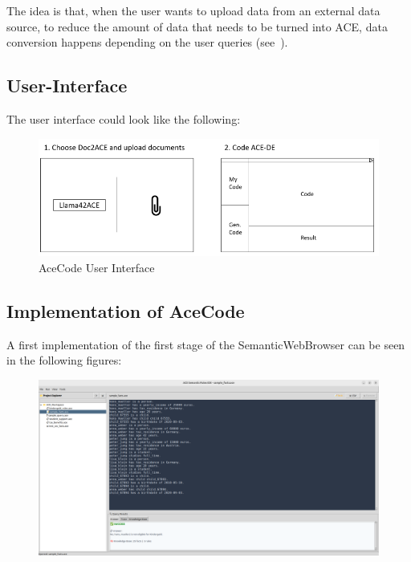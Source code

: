 \documentclass[12pt,a4paper]{article}
\begin{document}
The idea is that, when the user wants to upload data from an external data source, to reduce the amount of data that needs to be turned into ACE, data conversion happens depending on the user queries (see~\cite{schemaInference}).






\subsection{User-Interface}

The user interface could look like the following:

\begin{figure}[h]
\includegraphics[width=16cm]{ui_mock}
\caption{AceCode User Interface}
\end{figure}

\subsection{Implementation of AceCode}

A first implementation of the first stage of the SemanticWebBrowser can be seen in the following figures:

\begin{figure}[h]
    \includegraphics[width=16cm]{ace_code_screenshot_1}
\end{figure}
\end{document}
